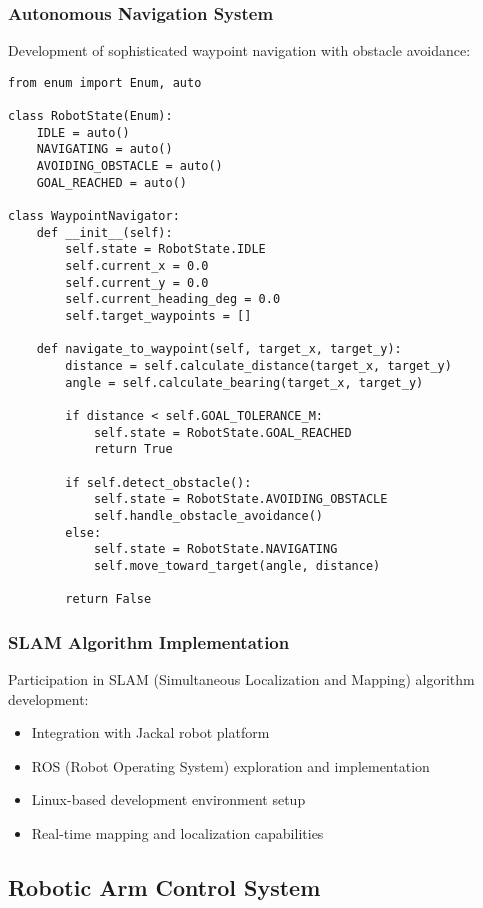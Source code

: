 \documentclass[12pt]{article}
\begin{document}
\subsubsection{Autonomous Navigation System}
Development of sophisticated waypoint navigation with obstacle avoidance:

\begin{lstlisting}[style=pythonstyle, caption={Navigation State Machine}]
from enum import Enum, auto

class RobotState(Enum):
    IDLE = auto()
    NAVIGATING = auto()
    AVOIDING_OBSTACLE = auto()
    GOAL_REACHED = auto()

class WaypointNavigator:
    def __init__(self):
        self.state = RobotState.IDLE
        self.current_x = 0.0
        self.current_y = 0.0
        self.current_heading_deg = 0.0
        self.target_waypoints = []
        
    def navigate_to_waypoint(self, target_x, target_y):
        distance = self.calculate_distance(target_x, target_y)
        angle = self.calculate_bearing(target_x, target_y)
        
        if distance < self.GOAL_TOLERANCE_M:
            self.state = RobotState.GOAL_REACHED
            return True
            
        if self.detect_obstacle():
            self.state = RobotState.AVOIDING_OBSTACLE
            self.handle_obstacle_avoidance()
        else:
            self.state = RobotState.NAVIGATING
            self.move_toward_target(angle, distance)
            
        return False
\end{lstlisting}

\subsubsection{SLAM Algorithm Implementation}
Participation in SLAM (Simultaneous Localization and Mapping) algorithm development:
\begin{itemize}
\item Integration with Jackal robot platform
\item ROS (Robot Operating System) exploration and implementation
\item Linux-based development environment setup
\item Real-time mapping and localization capabilities
\end{itemize}

\subsection{Robotic Arm Control System}
\end{document}
